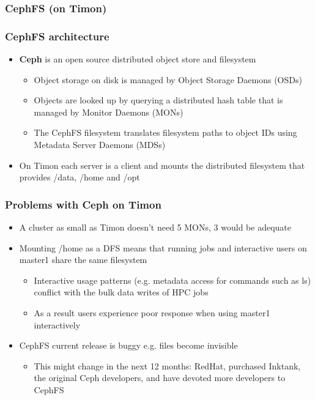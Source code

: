 \documentclass[handout]{beamer}
\begin{document}
\begin{frame}
\frametitle{CephFS (on Timon)}
\end{frame}

\begin{frame}
\frametitle{CephFS architecture}
\begin{itemize}
\item \textbf{Ceph} is an open source distributed object store and filesystem
\begin{itemize}
\item Object storage on disk is managed by Object Storage Daemons (OSDs)
\item Objects are looked up by querying a distributed hash table that is managed by Monitor Daemons (MONs)
\item The CephFS filesystem translates filesystem paths to object IDs using Metadata Server Daemons (MDSs)
\end{itemize}
\item{On Timon each server is a client and mounts the distributed filesystem that provides /data, /home and /opt}
\end{itemize}
\end{frame}

\begin{frame}
\frametitle{Problems with Ceph on Timon}
\begin{itemize}
\item A cluster as small as Timon doesn't need 5 MONs, 3 would be adequate
\item Mounting /home as a DFS means that running jobs and interactive users on master1 share the same filesystem
\begin{itemize}
\item Interactive usage patterns (e.g. metadata access for commands such as ls) conflict with the bulk data writes of HPC jobs
\item As a result users experience poor response when using master1 interactively
\end{itemize}
\item CephFS current release is buggy e.g. files become invisible
\begin{itemize}
\item This might change in the next 12 months: RedHat, purchased Inktank, the original Ceph developers, and have devoted more developers to CephFS
\end{itemize}
\end{itemize}
\end{frame}
\end{document}
